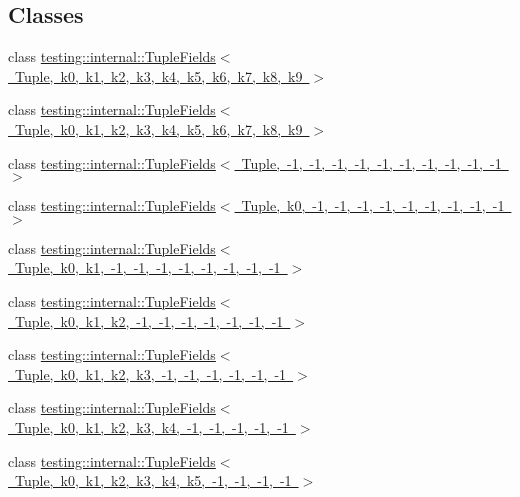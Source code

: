 \subsection*{Classes}
\begin{DoxyCompactItemize}
\item 
class \mbox{\hyperlink{classtesting_1_1internal_1_1TupleFields}{testing\+::internal\+::\+Tuple\+Fields$<$ Tuple, k0, k1, k2, k3, k4, k5, k6, k7, k8, k9 $>$}}
\item 
class \mbox{\hyperlink{classtesting_1_1internal_1_1TupleFields}{testing\+::internal\+::\+Tuple\+Fields$<$ Tuple, k0, k1, k2, k3, k4, k5, k6, k7, k8, k9 $>$}}
\item 
class \mbox{\hyperlink{classtesting_1_1internal_1_1TupleFields_3_01Tuple_00_01-1_00_01-1_00_01-1_00_01-1_00_01-1_00_01-e023d39d312048e71832a898e9e07f70}{testing\+::internal\+::\+Tuple\+Fields$<$ Tuple, -\/1, -\/1, -\/1, -\/1, -\/1, -\/1, -\/1, -\/1, -\/1, -\/1 $>$}}
\item 
class \mbox{\hyperlink{classtesting_1_1internal_1_1TupleFields_3_01Tuple_00_01k0_00_01-1_00_01-1_00_01-1_00_01-1_00_01-d80da5b2d6dff94ddefe7f2fc2de778d}{testing\+::internal\+::\+Tuple\+Fields$<$ Tuple, k0, -\/1, -\/1, -\/1, -\/1, -\/1, -\/1, -\/1, -\/1, -\/1 $>$}}
\item 
class \mbox{\hyperlink{classtesting_1_1internal_1_1TupleFields_3_01Tuple_00_01k0_00_01k1_00_01-1_00_01-1_00_01-1_00_01-fb5812c507091ce72ac353453b83394d}{testing\+::internal\+::\+Tuple\+Fields$<$ Tuple, k0, k1, -\/1, -\/1, -\/1, -\/1, -\/1, -\/1, -\/1, -\/1 $>$}}
\item 
class \mbox{\hyperlink{classtesting_1_1internal_1_1TupleFields_3_01Tuple_00_01k0_00_01k1_00_01k2_00_01-1_00_01-1_00_01-d40fb0064dd627afc9c2b7f6513ffcb3}{testing\+::internal\+::\+Tuple\+Fields$<$ Tuple, k0, k1, k2, -\/1, -\/1, -\/1, -\/1, -\/1, -\/1, -\/1 $>$}}
\item 
class \mbox{\hyperlink{classtesting_1_1internal_1_1TupleFields_3_01Tuple_00_01k0_00_01k1_00_01k2_00_01k3_00_01-1_00_01-5ce285d726b58f03354f318c4712939e}{testing\+::internal\+::\+Tuple\+Fields$<$ Tuple, k0, k1, k2, k3, -\/1, -\/1, -\/1, -\/1, -\/1, -\/1 $>$}}
\item 
class \mbox{\hyperlink{classtesting_1_1internal_1_1TupleFields_3_01Tuple_00_01k0_00_01k1_00_01k2_00_01k3_00_01k4_00_01-111caa1fee55a41736499c292bb1a612}{testing\+::internal\+::\+Tuple\+Fields$<$ Tuple, k0, k1, k2, k3, k4, -\/1, -\/1, -\/1, -\/1, -\/1 $>$}}
\item 
class \mbox{\hyperlink{classtesting_1_1internal_1_1TupleFields_3_01Tuple_00_01k0_00_01k1_00_01k2_00_01k3_00_01k4_00_01k15c11b8436218f7eb1523adb30f3f284}{testing\+::internal\+::\+Tuple\+Fields$<$ Tuple, k0, k1, k2, k3, k4, k5, -\/1, -\/1, -\/1, -\/1 $>$}}

\end{DoxyCompactItemize}
